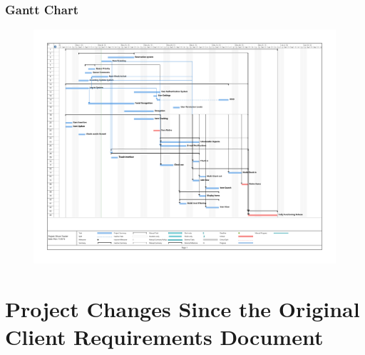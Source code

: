 \documentclass[10pt, onecolumn, twoside, peerreview]{IEEEtran}
\begin{document}
\subsubsection{Gantt Chart}
\begin{figure}[H]
	\includegraphics[angle=90, width=\textwidth]{gantt}
\end{figure}
\clearpage

\section{Project Changes Since the Original Client Requirements Document}
\end{document}
